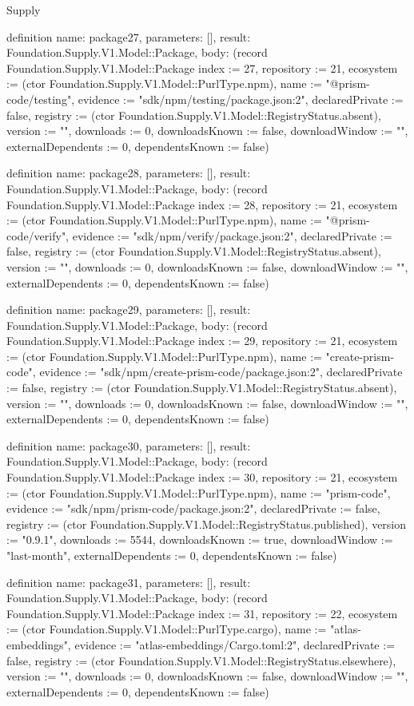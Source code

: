 \begin{lexlean}{Supply}
\begin{semanticmodule}
definition{
  name: package27,
  parameters: [],
  result: Foundation.Supply.V1.Model::Package,
  body: (record Foundation.Supply.V1.Model::Package {index := 27, repository := 21, ecosystem := (ctor Foundation.Supply.V1.Model::PurlType.npm), name := "@prism-code/testing", evidence := "sdk/npm/testing/package.json:2", declaredPrivate := false, registry := (ctor Foundation.Supply.V1.Model::RegistryStatus.absent), version := "", downloads := 0, downloadsKnown := false, downloadWindow := "", externalDependents := 0, dependentsKnown := false})
}

definition{
  name: package28,
  parameters: [],
  result: Foundation.Supply.V1.Model::Package,
  body: (record Foundation.Supply.V1.Model::Package {index := 28, repository := 21, ecosystem := (ctor Foundation.Supply.V1.Model::PurlType.npm), name := "@prism-code/verify", evidence := "sdk/npm/verify/package.json:2", declaredPrivate := false, registry := (ctor Foundation.Supply.V1.Model::RegistryStatus.absent), version := "", downloads := 0, downloadsKnown := false, downloadWindow := "", externalDependents := 0, dependentsKnown := false})
}

definition{
  name: package29,
  parameters: [],
  result: Foundation.Supply.V1.Model::Package,
  body: (record Foundation.Supply.V1.Model::Package {index := 29, repository := 21, ecosystem := (ctor Foundation.Supply.V1.Model::PurlType.npm), name := "create-prism-code", evidence := "sdk/npm/create-prism-code/package.json:2", declaredPrivate := false, registry := (ctor Foundation.Supply.V1.Model::RegistryStatus.absent), version := "", downloads := 0, downloadsKnown := false, downloadWindow := "", externalDependents := 0, dependentsKnown := false})
}

definition{
  name: package30,
  parameters: [],
  result: Foundation.Supply.V1.Model::Package,
  body: (record Foundation.Supply.V1.Model::Package {index := 30, repository := 21, ecosystem := (ctor Foundation.Supply.V1.Model::PurlType.npm), name := "prism-code", evidence := "sdk/npm/prism-code/package.json:2", declaredPrivate := false, registry := (ctor Foundation.Supply.V1.Model::RegistryStatus.published), version := "0.9.1", downloads := 5544, downloadsKnown := true, downloadWindow := "last-month", externalDependents := 0, dependentsKnown := false})
}

definition{
  name: package31,
  parameters: [],
  result: Foundation.Supply.V1.Model::Package,
  body: (record Foundation.Supply.V1.Model::Package {index := 31, repository := 22, ecosystem := (ctor Foundation.Supply.V1.Model::PurlType.cargo), name := "atlas-embeddings", evidence := "atlas-embeddings/Cargo.toml:2", declaredPrivate := false, registry := (ctor Foundation.Supply.V1.Model::RegistryStatus.elsewhere), version := "", downloads := 0, downloadsKnown := false, downloadWindow := "", externalDependents := 0, dependentsKnown := false})
}


\end{semanticmodule}
\end{lexlean}
